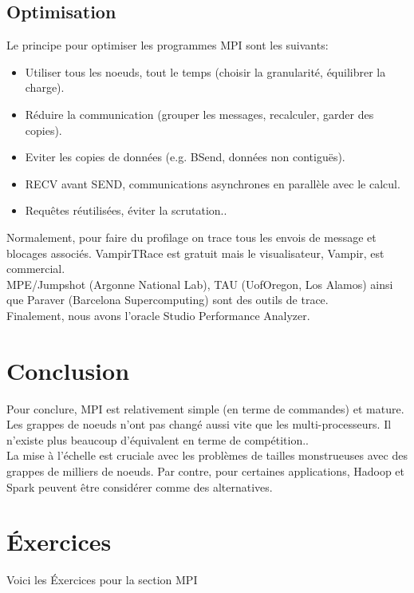 \documentclass[oneside]{book}
\begin{document}
\subsection{Optimisation}
Le principe pour optimiser les programmes MPI sont les suivants:\\
\begin{itemize}
\item Utiliser tous les noeuds, tout le temps (choisir la
granularité, équilibrer la charge).

\item Réduire la communication (grouper les messages,
recalculer, garder des copies).

\item Eviter les copies de données (e.g. BSend, données non
contiguës).

\item RECV avant SEND, communications asynchrones en
parallèle avec le calcul.

\item Requêtes réutilisées, éviter la scrutation..
\end{itemize}

Normalement, pour faire du profilage on trace tous les envois de message et blocages associés. VampirTRace est gratuit mais le visualisateur, Vampir, est commercial. \\

MPE/Jumpshot (Argonne National Lab), TAU (UofOregon, Los Alamos) ainsi que Paraver (Barcelona Supercomputing) sont des outils de trace. \\

Finalement, nous avons l'oracle Studio Performance Analyzer.\\

\section{Conclusion}

Pour conclure, MPI est relativement simple (en terme de commandes) et mature. Les grappes de noeuds n'ont pas changé aussi vite que les multi-processeurs. Il n'existe plus beaucoup d'équivalent en terme de compétition.. \\

La mise à l'échelle est cruciale avec les problèmes de tailles monstrueuses avec des grappes de milliers de noeuds. Par contre, pour certaines applications, Hadoop et Spark peuvent être considérer comme des alternatives.
\section{Éxercices}
Voici les Éxercices pour la section MPI
\end{document}
